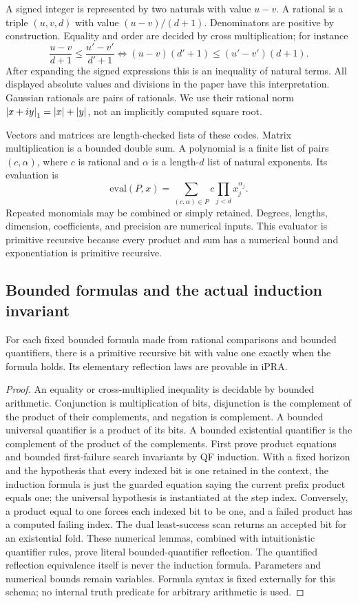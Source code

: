 A signed integer is represented by two naturals with value \(u-v\). A rational is a triple \((u,v,d)\) with value \((u-v)/(d+1)\). Denominators are positive by construction. Equality and order are decided by cross multiplication; for instance
\[
 \frac{u-v}{d+1}\le\frac{u'-v'}{d'+1}
 \iff (u-v)(d'+1)\le(u'-v')(d+1).
\]
After expanding the signed expressions this is an inequality of natural terms. All displayed absolute values and divisions in the paper have this interpretation. Gaussian rationals are pairs of rationals. We use their rational norm
\(\left|x+iy\right|_1=\left|x\right|+\left|y\right|\), not an implicitly computed square root.

Vectors and matrices are length-checked lists of these codes. Matrix multiplication is a bounded double sum. A polynomial is a finite list of pairs \((c,\alpha)\), where \(c\) is rational and \(\alpha\) is a length-\(d\) list of natural exponents. Its evaluation is
\[
 \mathrm{eval}(P,x)=\sum_{(c,\alpha)\in P}c\prod_{j<d}x_j^{\alpha_j}.
\]
Repeated monomials may be combined or simply retained. Degrees, lengths, dimension, coefficients, and precision are numerical inputs. This evaluator is primitive recursive because every product and sum has a numerical bound and exponentiation is primitive recursive.

\subsection{Bounded formulas and the actual induction invariant}

\begin{lemma}\label{lem:boolean}
For each fixed bounded formula made from rational comparisons and bounded quantifiers, there is a primitive recursive bit with value one exactly when the formula holds. Its elementary reflection laws are provable in iPRA.
\end{lemma}
\begin{proof}
An equality or cross-multiplied inequality is decidable by bounded arithmetic. Conjunction is multiplication of bits, disjunction is the complement of the product of their complements, and negation is complement. A bounded universal quantifier is a product of its bits. A bounded existential quantifier is the complement of the product of the complements. First prove product equations and bounded first-failure search invariants by QF induction. With a fixed horizon and the hypothesis that every indexed bit is one retained in the context, the induction formula is just the guarded equation saying the current prefix product equals one; the universal hypothesis is instantiated at the step index. Conversely, a product equal to one forces each indexed bit to be one, and a failed product has a computed failing index. The dual least-success scan returns an accepted bit for an existential fold. These numerical lemmas, combined with intuitionistic quantifier rules, prove literal bounded-quantifier reflection. The quantified reflection equivalence itself is never the induction formula. Parameters and numerical bounds remain variables. Formula syntax is fixed externally for this schema; no internal truth predicate for arbitrary arithmetic is used.
\end{proof}

